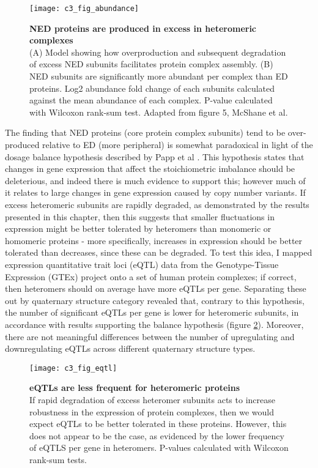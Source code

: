 \documentclass[a4paper,11pt,twoside,openright]{scrbook}
\begin{document}
\begin{figure}[h]
\fcapsideright
    {\caption[NED proteins are produced in excess in heteromeric
    complexes]{\sffamily\textbf{NED proteins are produced in excess in
    heteromeric complexes} \\ \small (A) Model showing how overproduction and
    subsequent degradation of excess NED subunits facilitates protein complex
    assembly. (B) NED subunits are significantly more abundant per complex than
    ED proteins. Log2 abundance fold change of each subunits calculated against
    the mean abundance of each complex. P-value calculated with Wilcoxon
    rank-sum test. Adapted from figure 5, McShane et al.
    \cite{McShane2016}}\label{figure:nedabundance}}
    {\texttt{[image: c3\_fig\_abundance]}}
\end{figure}

The finding that NED proteins (core protein complex subunits) tend to be
over-produced relative to ED (more peripheral) is somewhat paradoxical in light
of the dosage balance hypothesis described by Papp et al \cite{Papp2003}. This
hypothesis states that changes in gene expression that affect the stoichiometric
imbalance should be deleterious, and indeed there is much evidence to support
this; however much of it relates to large changes in gene expression caused by
copy number variants. If excess heteromeric subunits are rapidly degraded, as
demonstrated by the results presented in this chapter, then this suggests that
smaller fluctuations in expression might be better tolerated by heteromers than
monomeric or homomeric proteins - more specifically, increases in expression
should be better tolerated than decreases, since these can be degraded. To test
this idea, I mapped expression quantitative trait loci (eQTL) data from the
Genotype-Tissue Expression \cite{Brown2016} (GTEx) project onto a set of human
protein complexes; if correct, then heteromers should on average have more eQTLs
per gene. Separating these out by quaternary structure category revealed that,
contrary to this hypothesis, the number of significant eQTLs per gene is lower
for heteromeric subunits, in accordance with results supporting the balance
hypothesis (figure \ref{figure:eqtls}). Moreover, there are not meaningful
differences between the number of upregulating and downregulating eQTLs across
different quaternary structure types.

\begin{figure}[h]
\fcapsideright
    {\caption[eQTLs are less frequent for heteromeric
    proteins]{\sffamily\textbf{eQTLs are less frequent for heteromeric proteins}
    \\ \small If rapid degradation of excess heteromer subunits acts to increase
    robustness in the expression of protein complexes, then we would expect
    eQTLs to be better tolerated in these proteins. However, this does not
    appear to be the case, as evidenced by the lower frequency of eQTLS per gene
    in heteromers. P-values calculated with Wilcoxon rank-sum
    tests.}\label{figure:eqtls}}
    {\texttt{[image: c3\_fig\_eqtl]}}
\end{figure}
\end{document}
